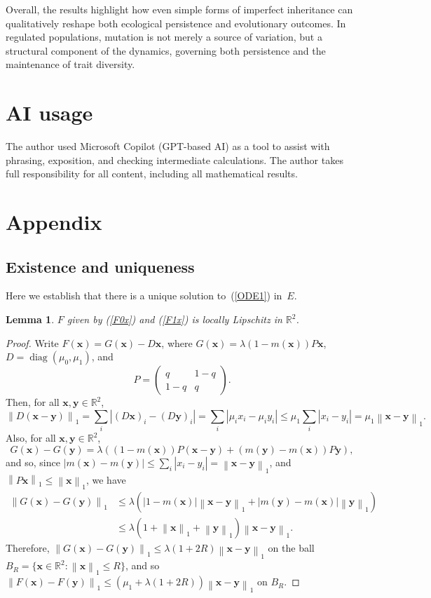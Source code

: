 \documentclass[12pt]{article}
\newtheorem{lemma}{Lemma}
\newcommand\R{\ensuremath{\mathbb{R}}}
\newcommand{\by}{\boldsymbol{y}}
\newcommand{\norm}[1]{\left\lVert #1 \right\rVert}
\newcommand{\bx}{\boldsymbol{x}}
\begin{document}
Overall, the results highlight how even simple forms of imperfect
inheritance can qualitatively reshape both ecological persistence and
evolutionary outcomes. In regulated populations, mutation is not merely
a source of variation, but a structural component of the dynamics,
governing both persistence and the maintenance of trait diversity.

\section{AI usage}

The author used Microsoft Copilot (GPT-based AI) as a tool to assist
with phrasing, exposition, and checking intermediate calculations. The
author takes full responsibility for all content, including all
mathematical results.

\section{Appendix}

\subsection{Existence and uniqueness}
\label{appendix1}

Here we establish that there is a unique solution to~(\ref{ODE1}) in~$E$.

\begin{lemma}\label{locallyLipschitz}
$F$ given by (\ref{F0x}) and (\ref{F1x}) is locally Lipschitz in $\R^2$.
\end{lemma}

\begin{proof}
Write $F(\bx) =G(\bx) - D\bx$, where $G(\bx)=\lambda (1-m(\bx))P\bx$,
$D=\operatorname{diag}(\mu_0,\mu_1)$, and
$$
P=
\begin{pmatrix}
q   & 1-q \\
1-q & q
\end{pmatrix}.
$$
Then, for all $\bx,\by\in \R^2$,
$$
\norm{D(\bx-\by)}_1
=\sum_i |(D\bx)_i - (D\by)_i|
=\sum_i |\mu_i x_i - \mu_i y_i|
\leq \mu_1 \sum_i |x_i - y_i|
=\mu_1 \norm{\bx-\by}_1.
$$
Also, for all $\bx,\by\in \R^2$,
$$
G(\bx)-G(\by) = \lambda \left( (1-m(\bx)) P(\bx-\by) +
(m(\by)-m(\bx))P\by \right),
$$
and so, since 
$|m(\bx)-m(\by)| \leq \sum_i |x_i -y_i| =\norm{\bx-\by}_1$, 
and $\norm{P\bx}_1 \leq \norm{\bx}_1$, we have
\begin{align*}
\norm{G(\bx)-G(\by)}_1 
&\leq  \lambda 
\left( |1-m(\bx)| \norm{\bx-\by}_1 + |m(\by)-m(\bx)|\norm{\by}_1
\right)\\
&\leq
\lambda (1 + \norm{\bx}_1 + \norm{\by}_1)\norm{\bx-\by}_1.
\end{align*}
Therefore, $\norm{G(\bx)-G(\by)}_1 \leq \lambda (1 + 2R)\norm{\bx-\by}_1$ on
the ball $B_R=\{\bx\in \R^2: \norm{\bx}_1\leq R\}$, and
so $\norm{F(\bx)-F(\by)}_1 
\leq (\mu_1+\lambda (1 + 2R))\norm{\bx-\by}_1$ on $B_R$.
\end{proof}
\end{document}
